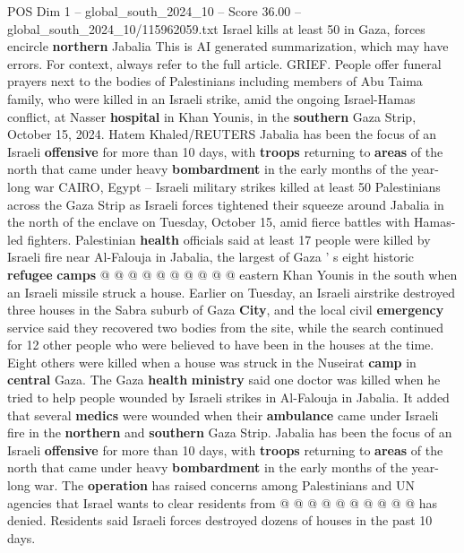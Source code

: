 \begin{textsample}{POS Dim 1 – global\_south\_2024\_10 – Score 36.00 – global\_south\_2024\_10/115962059.txt}  \label{ex:f1_pos_161}
Israel kills at least 50 in Gaza, forces encircle \textbf{northern} Jabalia This is AI generated summarization, which may have errors.
For context, always refer to the full article.
GRIEF.
People offer funeral prayers next to the bodies of Palestinians including members of Abu Taima family, who were killed in an Israeli strike, amid the ongoing Israel-Hamas conflict, at Nasser \textbf{hospital} in Khan Younis, in the \textbf{southern} Gaza Strip, October 15, 2024.
Hatem Khaled/REUTERS Jabalia has been the focus of an Israeli \textbf{offensive} for more than 10 days, with \textbf{troops} returning to \textbf{areas} of the north that came under heavy \textbf{bombardment} in the early months of the year-long war CAIRO, Egypt -- Israeli military strikes killed at least 50 Palestinians across the Gaza Strip as Israeli forces tightened their squeeze around Jabalia in the north of the enclave on Tuesday, October 15, amid fierce battles with Hamas-led fighters.
Palestinian \textbf{health} officials said at least 17 people were killed by Israeli fire near Al-Falouja in Jabalia, the largest of Gaza ' s eight historic \textbf{refugee} \textbf{camps} @ @ @ @ @ @ @ @ @ @ eastern Khan Younis in the south when an Israeli missile struck a house.
Earlier on Tuesday, an Israeli airstrike destroyed three houses in the Sabra suburb of Gaza \textbf{City}, and the local civil \textbf{emergency} service said they recovered two bodies from the site, while the search continued for 12 other people who were believed to have been in the houses at the time.
Eight others were killed when a house was struck in the Nuseirat \textbf{camp} in \textbf{central} Gaza.
The Gaza \textbf{health} \textbf{ministry} said one doctor was killed when he tried to help people wounded by Israeli strikes in Al-Falouja in Jabalia.
It added that several \textbf{medics} were wounded when their \textbf{ambulance} came under Israeli fire in the \textbf{northern} and \textbf{southern} Gaza Strip.
Jabalia has been the focus of an Israeli \textbf{offensive} for more than 10 days, with \textbf{troops} returning to \textbf{areas} of the north that came under heavy \textbf{bombardment} in the early months of the year-long war.
The \textbf{operation} has raised concerns among Palestinians and UN agencies that Israel wants to clear residents from @ @ @ @ @ @ @ @ @ @ has denied.
Residents said Israeli forces destroyed dozens of houses in the past 10 days.

\end{textsample}
